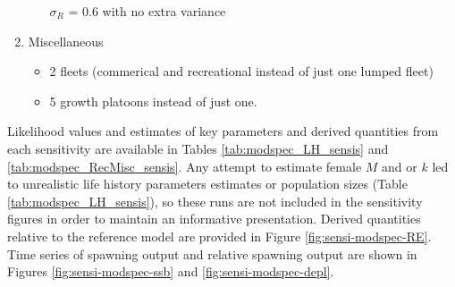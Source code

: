 \documentclass[11pt,
  english,
  a4paper,
]{article}
\begin{document}
\begin{enumerate}
\begin{itemize}
    {\(\sigma_R\)\leavevmode\tagmcend\tagstructend} = 0.6 with no extra variance

    \tagmcend\tagstructend\tagstructend

    \tagmcend\tagstructend\tagstructend
  \end{itemize}

  \tagstructend
\item

  Miscellaneous

  \tagmcend\tagstructend\tagstructend


  \begin{itemize}
  \item


    2 fleets (commerical and recreational instead of just one lumped fleet)

    \tagmcend\tagstructend\tagstructend

    \tagmcend\tagstructend\tagstructend
  \item


    5 growth platoons instead of just one.

    \tagmcend\tagstructend\tagstructend

    \tagmcend\tagstructend\tagstructend
  \end{itemize}

  \tagstructend
\end{enumerate}

\tagstructend


Likelihood values and estimates of key parameters and derived quantities from each sensitivity are available in Tables \ref{tab:modspec_LH_sensis} and \ref{tab:modspec_RecMisc_sensis}. Any attempt to estimate female {\(M\)\leavevmode\tagmcend\tagstructend} and or {\(k\)\leavevmode\tagmcend\tagstructend} led to unrealistic life history parameters estimates or population sizes (Table \ref{tab:modspec_LH_sensis}), so these runs are not included in the sensitivity figures in order to maintain an informative presentation. Derived quantities relative to the reference model are provided in Figure \ref{fig:sensi-modspec-RE}. Time series of spawning output and relative spawning output are shown in Figures \ref{fig:sensi-modspec-ssb} and \ref{fig:sensi-modspec-depl}.
\end{document}
